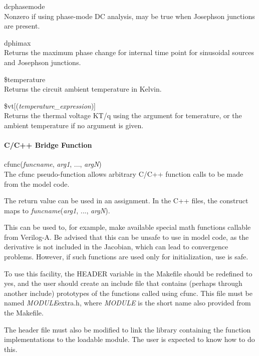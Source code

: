 \begin{description}
\begin{description}
\item{\vt dcphasemode}\\
Nonzero if using phase-mode DC analysis, may be true when Josephson
junctions are present.

\item{\vt dphimax}\\
Returns the maximum phase change for internal time point for
sinusoidal sources and Josephson junctions.
\end{description}

\item{\vt \$temperature}\\
Returns the circuit ambient temperature in Kelvin.

\item{\vt \$vt}[({\it temperature\_expression\/})]\\
Returns the thermal voltage KT/q using the argument for temerature, or
the ambient temperature if no argument is given.
\end{description}

\paragraph{{\WRspice} C/C++ Bridge Function}

\begin{description}
\item{\vt cfunc}({\it funcname\/}, {\it arg1\/}, ..., {\it argN\/})\\
The {\vt cfunc} pseudo-function allows arbitrary C/C++ function calls
to be made from the model code.

The return value can be used in an assignment.  In the C++ files, the
construct maps to {\it funcname\/}({\it arg1\/}, ..., {\it argN\/}).

This can be used to, for example, make available special math
functions callable from Verilog-A.  Be advised that this can be unsafe
to use in model code, as the derivative is not included in the
Jacobian, which can lead to convergence problems.  However, if such
functions are used only for initialization, use is safe.

To use this facility, the {\vt HEADER} variable in the {\vt Makefile}
should be redefined to yes, and the user should create an include file
that contains (perhaps through another include) prototypes of the
functions called using {\vt cfunc}.  This file must be named {\it
MODULE\/}{\vt extra.h}, where {\it MODULE} is the short name also
provided from the {\vt Makefile}.

The header file must also be modified to link the library containing
the function implementations to the loadable module.  The user is
expected to know how to do this.
\end{description}


